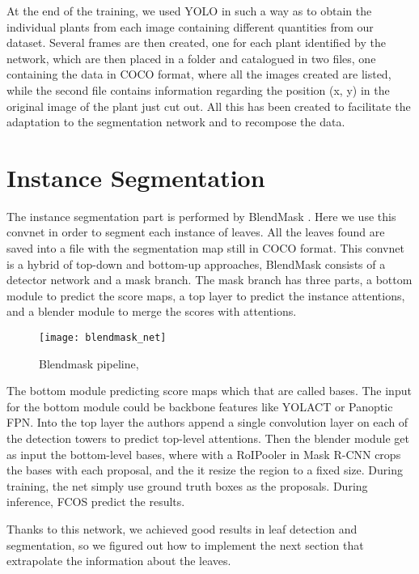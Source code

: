 At the end of the training, we used YOLO in such a way as to obtain the individual plants from each image containing different quantities from our dataset. Several
frames are then created, one for each plant identified by the network, which are then placed in a folder and catalogued in two files, one containing the data in COCO
\cite{lin2014microsoft} format, where all the images created are listed, while the second file contains information regarding the position (x, y) in the original image
of the plant just cut out. All this has been created to facilitate the adaptation to the segmentation network and to recompose the data.


\section{Instance Segmentation}
The instance segmentation part is performed by BlendMask \cite{chen2020blendmask}. Here we use this convnet in order to segment each instance of leaves. All the leaves found
are saved into a file with the segmentation map still in COCO format. This convnet is a hybrid of top-down and bottom-up approaches, BlendMask consists of a detector
network and a mask branch. The mask branch has three parts, a bottom module to predict the score maps, a top layer to predict the instance
attentions, and a blender module to merge the scores with attentions. 

\begin{figure}[h]
    \centering
    \texttt{[image: blendmask\_net]} 
    \caption{Blendmask pipeline, }
\end{figure}

The bottom module predicting score maps which that are called bases. The input for the bottom module could be backbone features like YOLACT or Panoptic FPN. 
Into the top layer the authors append a single convolution layer on each of the detection towers to predict top-level attentions. Then the blender module get as input the 
bottom-level bases, where with a RoIPooler in Mask R-CNN crops the bases with each proposal, and the it resize the region to a fixed size.
During training, the net simply use ground truth boxes as the proposals. During inference, FCOS \cite{tian2019fcos} predict the results. 

Thanks to this network, we achieved good results in leaf detection and segmentation, so we figured out how to implement the next section that extrapolate the information about
the leaves. 




